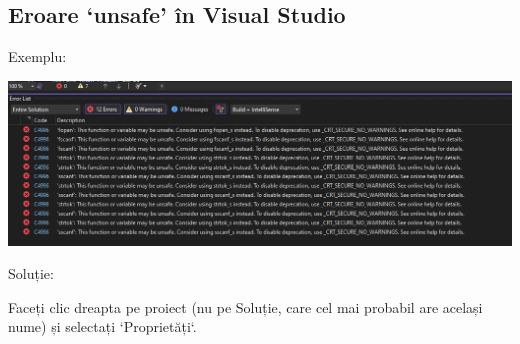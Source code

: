 \documentclass[../ro-fa-lab.tex]{subfiles}
\begin{document}
\subsection{Eroare `unsafe' în Visual Studio}\label{visual-studio-unsafe-error}

Exemplu:

\includegraphics[width=\textwidth,alt={A screenshot of a computer Description automatically generated}]{./Resources/tutorial_lab9/image8.png}

Soluție:

Faceți clic dreapta pe proiect (nu pe Soluție, care cel mai probabil are același nume) și selectați `Proprietăți`.
\end{document}
